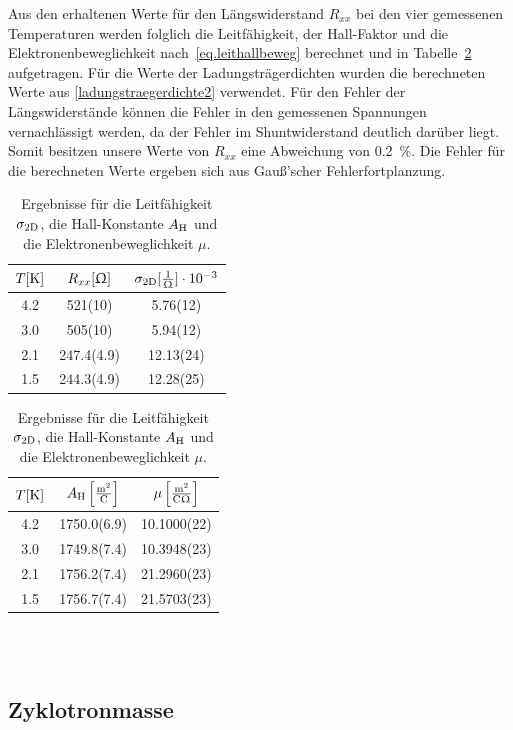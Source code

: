 \documentclass[paper=a4,fontsize=10pt,DIV=18,twocolumn,parskip=half]{scrartcl}
\numberwithin{equation}{section}    %
\newcommand{\kor}[1]{{\color{darkgreen}#1}}
\begin{document}
Aus den erhaltenen Werte für den Längswiderstand $R_{xx}$ bei den vier gemessenen Temperaturen werden folglich die Leitfähigkeit, der Hall-Faktor und die Elektronenbeweglichkeit nach~\eqref{eq.leithallbeweg} berechnet und in Tabelle~\ref{tab.leithallbeweg} aufgetragen. 
\kor{Für die Werte der Ladungsträgerdichten wurden die berechneten Werte aus \ref{ladungstraegerdichte2} verwendet.}
Für den Fehler der Längswiderstände können die Fehler in den gemessenen Spannungen vernachlässigt werden, da der Fehler im Shuntwiderstand deutlich darüber liegt. Somit besitzen unsere Werte von $R_{xx}$ eine Abweichung von \kor{\SI{0.2}{\percent}}. Die Fehler für die berechneten Werte ergeben sich aus Gauß'scher Fehlerfortplanzung.

\begin{table}[htp]
	\begin{center}
		\kor{\begin{tabular}{ccc}
			\hline
			$T[\rm K]$ & $R_{xx}[\Upomega]$ & $\sigma_{\rm 2D}[\frac{1}{\Upomega}] \cdot 10^{-3}$ \\
			\hline
			4.2 & 521(10) & 5.76(12) \\
			3.0 & 505(10) & 5.94(12) \\
			2.1 & 247.4(4.9) & 12.13(24) \\
			1.5 & 244.3(4.9) & 12.28(25) \\
			\hline
			\end{tabular}
			
			\begin{tabular}{ccc}
			\hline
			$T[\rm K]$ & $A_{\rm H}\left[ \frac{\mathrm{m}^2}{\mathrm{C}} \right]$ & $\mu \left[ \frac{\mathrm{m}^2}{\mathrm{C}\Upomega} \right]$\\
			\hline
			4.2 & 1750.0(6.9) & 10.1000(22) \\
			3.0 & 1749.8(7.4) & 10.3948(23) \\
			2.1 & 1756.2(7.4) & 21.2960(23) \\
			1.5 & 1756.7(7.4) & 21.5703(23) \\
			\hline
		\end{tabular}}
		\caption{Ergebnisse für die Leitfähigkeit $\sigma_{\rm 2D}$, die Hall-Konstante $A_{\rm H}$ und die Elektronenbeweglichkeit $\mu$.}
		\label{tab.leithallbeweg}
	\end{center}
\end{table}
%
~~~~~~~~~~~~~~~~~~~~~~~~~~~~~~~~~~~~~~~~~~~~~~~~~~~~~~~~~~~~~~~~~~~~~~~~~~~~~
\subsection{Zyklotronmasse}
\label{a4}
\end{document}
